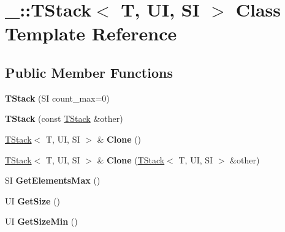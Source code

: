 \hypertarget{class___1_1_t_stack}{}\section{\+\_\+\+:\+:T\+Stack$<$ T, UI, SI $>$ Class Template Reference}
\label{class___1_1_t_stack}
\subsection*{Public Member Functions}
\begin{DoxyCompactItemize}
\item 
\mbox{\label{class___1_1_t_stack_a790c10c5af73eb3d910b1d075659a25d}} 
{\bfseries T\+Stack} (SI count\+\_\+max=0)
\item 
\mbox{\label{class___1_1_t_stack_a62baca70ce8f0d1b5e4bb555b7adf501}} 
{\bfseries T\+Stack} (const \mbox{\hyperlink{class___1_1_t_stack}{T\+Stack}} \&other)
\item 
\mbox{\label{class___1_1_t_stack_a8d68fc91698b66afab1036bb623fbc99}} 
\mbox{\hyperlink{class___1_1_t_stack}{T\+Stack}}$<$ T, UI, SI $>$ \& {\bfseries Clone} ()
\item 
\mbox{\label{class___1_1_t_stack_a9464f1b37ff222492b83a628ae47a6fa}} 
\mbox{\hyperlink{class___1_1_t_stack}{T\+Stack}}$<$ T, UI, SI $>$ \& {\bfseries Clone} (\mbox{\hyperlink{class___1_1_t_stack}{T\+Stack}}$<$ T, UI, SI $>$ \&other)
\item 
\mbox{\label{class___1_1_t_stack_ad74e57932cd860d645bd473ec79bf750}} 
SI {\bfseries Get\+Elements\+Max} ()
\item 
\mbox{\label{class___1_1_t_stack_aaecd85976fe80813c20d6d76d3102090}} 
UI {\bfseries Get\+Size} ()
\item 
\mbox{\label{class___1_1_t_stack_a151c919d282fd7b9327b24d0dceb0c93}} 
UI {\bfseries Get\+Size\+Min} ()
\item 
\mbox{\label{class___1_1_t_stack_a84325cbd818603034d8d04128819ea02}} 

\end{DoxyCompactItemize}
